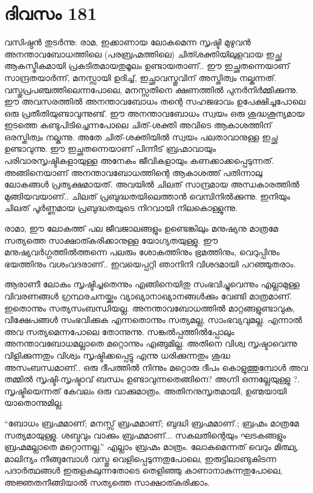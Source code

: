 \section{ദിവസം 181}


വസിഷ്ഠൻ തുടർന്നു: രാമ, ഇക്കാണായ ലോകമെന്ന സൃഷ്ടി മുഴുവൻ അനന്താവബോധത്തിലെ (പരബ്രഹ്മത്തിലെ) ചിത്ശക്തിയിലുളവായ ഇച്ഛ ആകസ്മീകമായി പ്രകടിതമായതുമൂലം ഉണ്ടായതാണ്‌..  ഈ ഇച്ഛതന്നെയാണ്‌ സാന്ദ്രതയാർന്ന്, മനസ്സായി ഉദിച്ച്, ഇച്ഛാവസ്തുവിന്‌ അസ്തിത്വം നല്കുന്നത്.  വസ്തുപ്രപഞ്ചത്തിലെന്നപോലെ, മനസ്സതിനെ ക്ഷണത്തിൽ പുനർനിർമ്മിക്കുന്നു. ഈ അവസരത്തിൽ അനന്താവബോധം തന്റെ സഹജഭാവം ഉപേക്ഷിച്ചപോലെ ഒരു പ്രതീതിയുണ്ടാവുന്നുണ്ട്. ഈ അനന്താവബോധം സ്വയം ഒരു ശുദ്ധശൂന്യമായ ഇടത്തെ കണ്ടുപിടിച്ചെന്നപോലെ ചിത്-ശക്തി അവിടെ ആകാശത്തിന്‌ ഒരസ്തിത്വം നല്കുന്നു. അതേ ചിത്-ശക്തിയിൽ സ്വയം പലതാവാനുള്ള ഇച്ഛ ഉണ്ടാവുന്നു. ഈ ഇച്ഛതന്നെയാണ്‌ പിന്നീട് ബ്രഹ്മാവായും പരിവാരസൃഷ്ടികളായുള്ള അനേകം ജീവികളായും കണക്കാക്കപ്പെടുന്നത്. അങ്ങിനെയാണ്‌ അനന്താവബോധത്തിന്റെ ആകാശത്ത് പതിന്നാലു ലോകങ്ങൾ പ്രത്യക്ഷമായത്. അവയിൽ ചിലത് സാന്ദ്രമായ അന്ധകാരത്തിൽ മുങ്ങിയവയാണ്‌..  ചിലത് പ്രബുദ്ധതയിലെത്താൻ വെമ്പിനിൽക്കുന്നു. ഇനിയും ചിലത് പൂർണ്ണമായ പ്രബുദ്ധതയുടെ നിറവായി നിലകൊള്ളുന്നു.

രാമാ, ഈ ലോകത്ത് പല ജീവജാലങ്ങളും ഉണ്ടെങ്കിലും മനുഷ്യനു മാത്രമേ സത്യത്തെ സാക്ഷാത്കരിക്കാനുള്ള യോഗ്യതയുള്ളു. ഈ മനുഷ്യവർഗ്ഗത്തിൽത്തന്നെ പലരും ശോകത്തിനും ഭ്രമത്തിനും, വെറുപ്പിനും ഭയത്തിനും വശംവദരാണ്‌..  ഇവയെപ്പറ്റി ഞാനിനി വിശദമായി പറഞ്ഞുതരാം.

ആരാണീ ലോകം സൃഷ്ടിച്ചതെന്നും എങ്ങിനെയിതു സംഭവിച്ചുവെന്നും എല്ലാമുള്ള വിവരണങ്ങൾ ഗ്രന്ഥരചനയ്ക്കും വ്യാഖ്യാനാഖ്യാനങ്ങൾക്കും വേണ്ടി മാത്രമാണ്‌. ഇതൊന്നും സത്യസംബന്ധിയല്ല. അനന്താവബോധത്തിൽ മാറ്റങ്ങളുണ്ടാവുക, വിക്ഷേപങ്ങൾ സംഭവിക്കുക എന്നതൊന്നും സത്യമല്ല, സാംഭവ്യവുമല്ല. എന്നാൽ അവ സത്യമെന്നപോലെ തോന്നുന്നു. സങ്കൽപ്പത്തിൽപ്പോലും അനന്താവബോധമല്ലാതെ മറ്റൊന്നും എങ്ങുമില്ല. അതിനെ വിശ്വ സൃഷ്ടാവെന്നു വിളിക്കുന്നതും  വിശ്വം സൃഷ്ടിക്കപ്പെട്ടു എന്നു ധരിക്കുന്നതും ശുദ്ധ  അസംബന്ധമാണ്‌..  ഒരു ദീപത്തിൽ നിന്നും മറ്റൊരു ദീപം കൊളുത്തുമ്പോൾ അവ തമ്മിൽ സൃഷ്ടി-സൃഷ്ടാവ് ബന്ധം ഉണ്ടാവുന്നതെങ്ങിനെ? അഗ്നി ഒന്നല്ലേയുള്ളു ?. സൃഷ്ടിയെന്നത് കേവലം ഒരു വാക്കുമാത്രം. അതിനനുസൃതമായി, ഉണ്മയായി യാതൊന്നുമില്ല.

“ബോധം ബ്രഹ്മമാണ്‌; മനസ്സ് ബ്രഹ്മമാണ്‌; ബുദ്ധി ബ്രഹ്മമാണ്‌.; ബ്രഹ്മം മാത്രമേ സത്യമായുള്ളു. ശബ്ദവും വാക്കും ബ്രഹ്മമാണ്‌... സകലതിന്റെയും ഘടകങ്ങളും ബ്രഹ്മമല്ലാതെ മറ്റൊന്നല്ല.” എല്ലാം ബ്രഹ്മം മാത്രം. ലോകമെന്നത് വെറും മിത്ഥ്യ. മാലിന്യം നീങ്ങുമ്പോൾ വസ്തു വെളിപ്പെടുന്നതുപോലെ, ഇരുട്ടിലാണ്ടുകിടന്ന പദാർത്ഥങ്ങൾ ഇരുളകലുന്നതോടെ തെളിഞ്ഞു കാണാനാകുന്നതുപോലെ, അജ്ഞതനീങ്ങിയാൽ സത്യത്തെ സാക്ഷാത്കരിക്കാം. 

